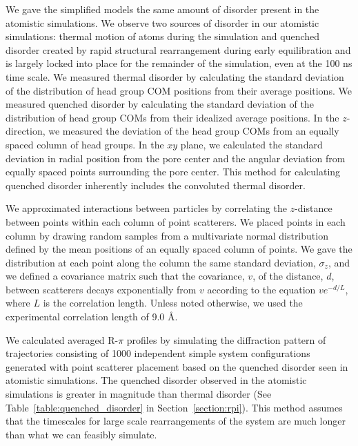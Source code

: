 \documentclass[journal=jpcbfk,manuscript=article]{achemso}
\begin{document}
  We gave the simplified models the same amount of disorder present in the atomistic
  simulations. We observe two sources of disorder in our atomistic simulations: thermal motion of atoms
  during the simulation and quenched disorder created by rapid structural rearrangement during 
  early equilibration and is largely locked into place for the remainder of the 
  simulation, even at the 100 ns time scale. We measured thermal disorder by calculating the standard deviation of 
  the distribution of head group COM positions from their average positions.
  We measured quenched disorder by calculating the standard deviation of the distribution
  of head group COMs from their idealized average positions. In the 
  $z$-direction, we measured the deviation of the head group COMs from an
  equally spaced column of head groups. In the $xy$ plane, we calculated the standard 
  deviation in radial position from the pore center and the angular deviation from 
  equally spaced points surrounding the pore center. This method for calculating 
  quenched disorder inherently includes the convoluted thermal disorder. 
  
  We approximated interactions between particles by correlating the $z$-distance 
  between points within each column of point scatterers. We placed points in each
  column by drawing random samples from a multivariate normal distribution defined
  by the mean positions of an equally spaced column of points. We gave the 
  distribution at each point along the column the same standard deviation, 
  $\sigma_z$, and we defined a covariance matrix such that the covariance, $v$, of
  the distance, $d$, between scatterers decays exponentially from $v$ according
  to the equation $ve^{-d/L}$, where $L$ is the correlation length. Unless noted
  otherwise, we used the experimental correlation length of 9.0 \AA. 
  
  We calculated averaged R-$\pi$ profiles by simulating the diffraction pattern
  of trajectories consisting of 1000 independent simple system configurations 
  generated with point scatterer placement based on the quenched disorder seen in
  atomistic simulations. The quenched disorder observed in the atomistic simulations is greater in magnitude than thermal 
  disorder (See Table~\ref{table:quenched_disorder} in Section~\ref{section:rpi}).
  This method 
  assumes that the timescales for large scale rearrangements of the
  system are much longer than what we can feasibly simulate.
\end{document}
